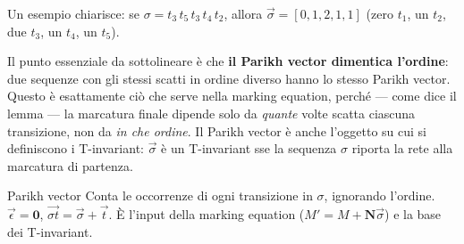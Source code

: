 Un esempio chiarisce: se $\sigma = t_3\, t_5\, t_3\, t_4\, t_2$, allora $\vec{\sigma} = [0,1,2,1,1]$ (zero $t_1$, un $t_2$, due $t_3$, un $t_4$, un $t_5$).

Il punto essenziale da sottolineare è che \textbf{il Parikh vector dimentica l'ordine}: due sequenze con gli stessi scatti in ordine diverso hanno lo stesso Parikh vector. Questo è esattamente ciò che serve nella marking equation, perché — come dice il lemma — la marcatura finale dipende solo da \emph{quante} volte scatta ciascuna transizione, non da \emph{in che ordine}. Il Parikh vector è anche l'oggetto su cui si definiscono i T-invariant: $\vec{\sigma}$ è un T-invariant sse la sequenza $\sigma$ riporta la rete alla marcatura di partenza.

\begin{puntochiave}{Parikh vector}
Conta le occorrenze di ogni transizione in $\sigma$, ignorando l'ordine. $\vec\epsilon=\mathbf{0}$, $\overrightarrow{\sigma t}=\vec\sigma+\vec t$. È l'input della marking equation ($M'=M+\mathbf N\vec\sigma$) e la base dei T-invariant.
\end{puntochiave}
